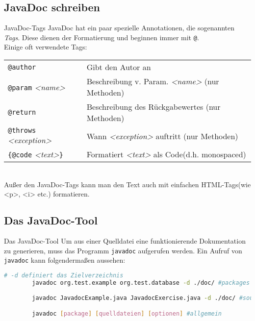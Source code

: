 \subsection{JavaDoc schreiben}
\begin{frame}{JavaDoc-Tags}
    JavaDoc hat ein paar spezielle Annotationen, die sogenannten \textit{Tags}. Diese dienen der Formatierung und beginnen immer mit \texttt{@}.\\
    Einige oft verwendete Tags:\\
    \bigskip
    \begin{tabular}{l | l}
        \texttt{@author} & Gibt den Autor an \\
        \texttt{@param} \textit{<name>} & Beschreibung v. Param. \textit{<name>} (nur Methoden)\\
        \texttt{@return} & Beschreibung des Rückgabewertes (nur Methoden) \\
        \texttt{@throws} \textit{<exception>} & Wann \textit{<exception>} auftritt (nur Methoden)\\
        \texttt{\{@code} \textit{<text>}\texttt{\}} & Formatiert \textit{<text>} als Code(d.h. monospaced) \\
    \end{tabular} \\ %
    \bigskip
    Außer den JavaDoc-Tags kann man den Text auch mit einfachen HTML-Tags(wie <p>, <i> etc.) formatieren.
\end{frame}

\subsection{Das JavaDoc-Tool}
\begin{frame}[fragile]{Das JavaDoc-Tool}
    Um aus einer Quelldatei eine funktionierende Dokumentation zu generieren, muss das Programm \texttt{javadoc} aufgerufen werden.
    Ein Aufruf von \texttt{javadoc} kann folgendermaßen aussehen:
    \begin{lstlisting}[language=bash,gobble=8]
        # -d definiert das Zielverzeichnis
        javadoc org.test.example org.test.database -d ./doc/ #packages

        javadoc JavadocExample.java JavadocExercise.java -d ./doc/ #sourcefiles

        javadoc [package] [quelldateien] [optionen] #allgemein
    \end{lstlisting}
\end{frame}

